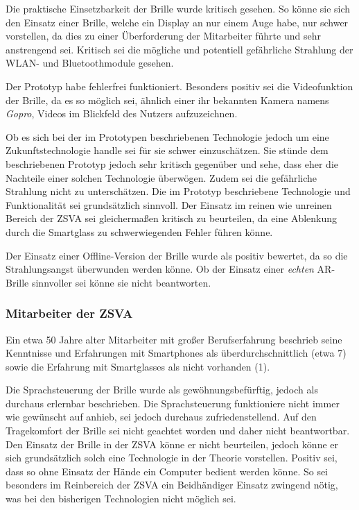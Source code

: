 Die praktische Einsetzbarkeit der Brille wurde kritisch gesehen. So könne sie sich den Einsatz einer Brille, welche ein Display an nur einem Auge habe, nur schwer vorstellen, da dies zu einer Überforderung der Mitarbeiter führte und sehr anstrengend sei. Kritisch sei die mögliche und potentiell gefährliche Strahlung der WLAN- und Bluetoothmodule gesehen.

Der Prototyp habe fehlerfrei funktioniert. Besonders positiv sei die Videofunktion der Brille, da es so möglich sei, ähnlich einer ihr bekannten Kamera namens \emph{Gopro}, Videos im Blickfeld des Nutzers aufzuzeichnen. 

Ob es sich bei der im Prototypen beschriebenen Technologie jedoch um eine Zukunftstechnologie handle sei für sie schwer einzuschätzen. Sie stünde dem beschriebenen Prototyp jedoch sehr kritisch gegenüber und sehe, dass eher die Nachteile einer solchen Technologie überwögen. Zudem sei die gefährliche Strahlung nicht zu unterschätzen. Die im Prototyp beschriebene Technologie und Funktionalität sei grundsätzlich sinnvoll. Der Einsatz im reinen wie unreinen Bereich der ZSVA sei gleichermaßen kritisch zu beurteilen, da eine Ablenkung durch die Smartglass zu schwerwiegenden Fehler führen könne.

Der Einsatz einer Offline-Version der Brille wurde als positiv bewertet, da so die Strahlungsangst überwunden werden könne. Ob der Einsatz einer \emph{echten} AR-Brille sinnvoller sei könne sie nicht beantworten.
%
%
\subsubsection{Mitarbeiter der ZSVA}
%
Ein etwa 50 Jahre alter Mitarbeiter mit großer Berufserfahrung beschrieb seine Kenntnisse und Erfahrungen mit Smartphones als überdurchschnittlich (etwa 7) sowie die Erfahrung mit Smartglasses als nicht vorhanden (1).

Die Sprachsteuerung der Brille wurde als gewöhnungsbefürftig, jedoch als durchaus erlernbar beschrieben. Die Sprachsteuerung funktioniere nicht immer wie gewünscht auf anhieb, sei jedoch durchaus zufriedenstellend. Auf den Tragekomfort der Brille sei nicht geachtet worden und daher nicht beantwortbar. Den Einsatz der Brille in der ZSVA könne er nicht beurteilen, jedoch könne er sich grundsätzlich solch eine Technologie in der Theorie vorstellen. Positiv sei, dass so ohne Einsatz der Hände ein Computer bedient werden könne. So sei besonders im Reinbereich der ZSVA ein Beidhändiger Einsatz zwingend nötig, was bei den bisherigen Technologien nicht möglich sei. 

